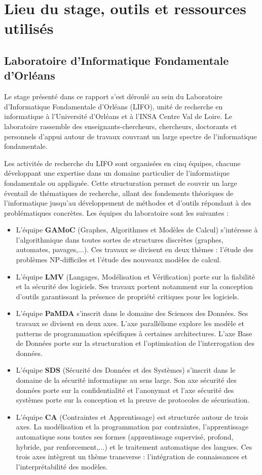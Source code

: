 \chapter{Lieu du stage, outils et ressources utilisés}

\section{Laboratoire d'Informatique Fondamentale d'Orléans}
    Le stage présenté dans ce rapport s'est déroulé au sein du Laboratoire d'Informatique Fondamentale d'Orléans (LIFO), unité de recherche en informatique à l'Université d'Orléans et à l'INSA Centre Val de Loire. Le laboratoire rassemble des enseignants-chercheurs, chercheurs, doctorants et personnels d'appui autour de travaux couvrant un large spectre de l'informatique fondamentale.

    Les activités de recherche du LIFO sont organisées en cinq équipes, chacune développant une expertise dans un domaine particulier de l'informatique fondamentale ou appliquée. Cette structuration permet de couvrir un large éventail de thématiques de recherche, allant des fondements théoriques de l'informatique jusqu'au développement de méthodes et d'outils répondant à des problématiques concrètes. Les équipes du laboratoire sont les suivantes :

    \begin{itemize}
        \item L'équipe \textbf{GAMoC} (Graphes, Algorithmes et Modèles de Calcul) s'intéresse à l'algorithmique dans toutes sortes de structures discrètes (graphes, automates, pavages,...). Ces travaux se divisent en deux thèmes : l'étude des problèmes NP-difficiles et l'étude des nouveaux modèles de calcul.
        \item L'équipe \textbf{LMV} (Langages, Modélisation et Vérification) porte sur la fiabilité et la sécurité des logiciels. Ses travaux portent notamment sur la conception d'outils garantissant la présence de propriété critiques pour les logiciels.
        \item L'équipe \textbf{PaMDA} s'inscrit dans le domaine des Sciences des Données. Ses travaux se divisent en deux axes. L'axe parallélisme explore les modèle et patterns de programmation spécifiques à certaines architectures. L'axe Base de Données porte sur la structuration et l'optimisation de l'interrogation des données.
        \item L'équipe \textbf{SDS} (Sécurité des Données et des Systèmes) s'inscrit dans le domaine de la sécurité informatique au sens large. Son axe sécurité des données  porte sur la confidentialité et l'anonymat et l'axe sécurité des systèmes porte sur la conception et la preuve de protocoles de sécurisation.
        \item L'équipe \textbf{CA} (Contraintes et Apprentissage) est structurée autour de trois axes. La modélisation et la programmation par contraintes, l'apprentissage automatique sous toutes ses formes (apprentissage supervisé, profond, hybride, par renforcement,...) et le traitement automatique des langues. Ces trois axes intègrent un thème transverse : l'intégration de connaissances et l'interprétabilité des modèles.
    \end{itemize}

